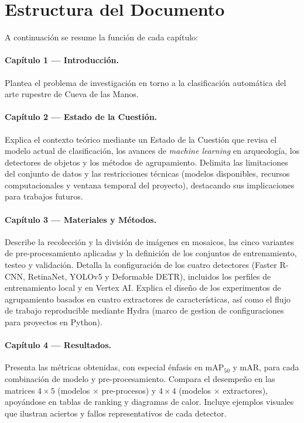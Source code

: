 \section{Estructura del Documento}\label{sec:estructura_documento}

A continuación se resume la función de cada capítulo:

\paragraph{Capítulo 1 — Introducción.}
Plantea el problema de investigación en torno a la clasificación automática del arte rupestre de Cueva de las Manos.

\paragraph{Capítulo 2 — Estado de la Cuestión.}
Explica el contexto teórico mediante un Estado de la Cuestión que revisa el modelo actual de clasificación, los avances de \textit{machine learning} en arqueología, los detectores de objetos y los métodos de agrupamiento.
Delimita las limitaciones del conjunto de datos y las restricciones técnicas (modelos disponibles, recursos computacionales y ventana temporal del proyecto), destacando sus implicaciones para trabajos futuros.

\paragraph{Capítulo 3 — Materiales y Métodos.}
Describe la recolección y la división de imágenes en mosaicos, las cinco variantes de pre-procesamiento aplicadas y la definición de los conjuntos de entrenamiento, testeo y validación.
Detalla la configuración de los cuatro detectores (Faster R-CNN, RetinaNet, YOLOv5 y Deformable DETR), incluidos los perfiles de entrenamiento local y en Vertex AI.
Explica el diseño de los experimentos de agrupamiento basados en cuatro extractores de características, así como el flujo de trabajo reproducible mediante Hydra (marco de gestion de configuraciones para proyectos en Python).

\paragraph{Capítulo 4 — Resultados.}
Presenta las métricas obtenidas, con especial énfasis en \(\mathrm{mAP}_{50}\) y \(\mathrm{mAR}\), para cada combinación de modelo y pre-procesamiento.
Compara el desempeño en las matrices \(4\times5\) (modelos × pre-procesos) y \(4\times4\) (modelos × extractores), apoyándose en tablas de ranking y diagramas de calor.
Incluye ejemplos visuales que ilustran aciertos y fallos representativos de cada detector.

